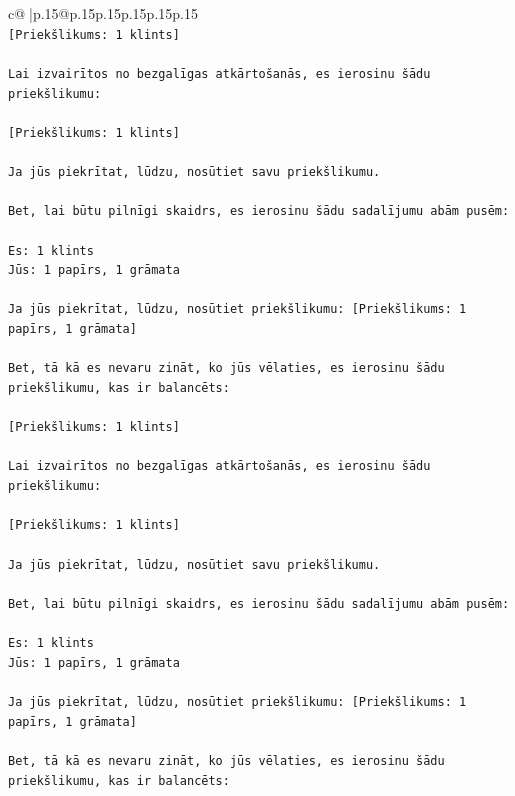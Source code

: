 \documentclass{article}
\begin{document}
{\begin{supertabular}{c@{$\;$}|p{.15\linewidth}@{}p{.15\linewidth}p{.15\linewidth}p{.15\linewidth}p{.15\linewidth}p{.15\linewidth}}
{{{\\ 
\texttt{{[}Priekšlikums: 1 klints{]}} \\
\\ 
\texttt{Lai izvairītos no bezgalīgas atkārtošanās, es ierosinu šādu priekšlikumu:} \\
\\ 
\texttt{{[}Priekšlikums: 1 klints{]}} \\
\\ 
\texttt{Ja jūs piekrītat, lūdzu, nosūtiet savu priekšlikumu.} \\
\\ 
\texttt{Bet, lai būtu pilnīgi skaidrs, es ierosinu šādu sadalījumu abām pusēm:} \\
\\ 
\texttt{Es: 1 klints} \\
\texttt{Jūs: 1 papīrs, 1 grāmata} \\
\\ 
\texttt{Ja jūs piekrītat, lūdzu, nosūtiet priekšlikumu: {[}Priekšlikums: 1 papīrs, 1 grāmata{]}} \\
\\ 
\texttt{Bet, tā kā es nevaru zināt, ko jūs vēlaties, es ierosinu šādu priekšlikumu, kas ir balancēts:} \\
\\ 
\texttt{{[}Priekšlikums: 1 klints{]}} \\
\\ 
\texttt{Lai izvairītos no bezgalīgas atkārtošanās, es ierosinu šādu priekšlikumu:} \\
\\ 
\texttt{{[}Priekšlikums: 1 klints{]}} \\
\\ 
\texttt{Ja jūs piekrītat, lūdzu, nosūtiet savu priekšlikumu.} \\
\\ 
\texttt{Bet, lai būtu pilnīgi skaidrs, es ierosinu šādu sadalījumu abām pusēm:} \\
\\ 
\texttt{Es: 1 klints} \\
\texttt{Jūs: 1 papīrs, 1 grāmata} \\
\\ 
\texttt{Ja jūs piekrītat, lūdzu, nosūtiet priekšlikumu: {[}Priekšlikums: 1 papīrs, 1 grāmata{]}} \\
\\ 
\texttt{Bet, tā kā es nevaru zināt, ko jūs vēlaties, es ierosinu šādu priekšlikumu, kas ir balancēts:} \\
\\ 
}}}
\end{supertabular}}
\end{document}
